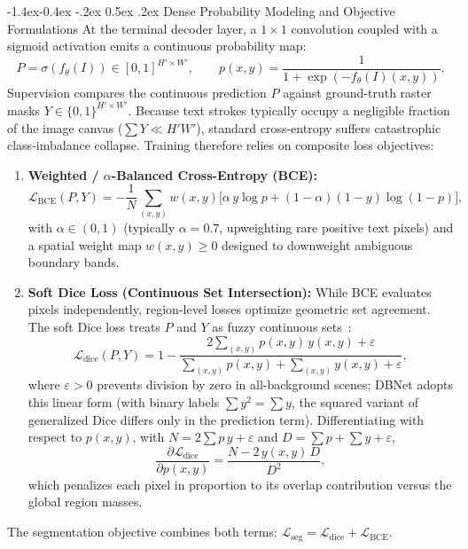 \documentclass[11pt,a4paper]{article}
\makeatletter
\renewcommand\subsection{\@startsection{subsection}{2}{\z@}%
                                     {-1.4ex\@plus -0.4ex \@minus -.2ex}%
                                     {0.5ex \@plus .2ex}%
                                     {\normalfont\normalsize\bfseries}}
\newcommand{\1}{\mathbf{1}}
\makeatother
\begin{document}
\subsection{Dense Probability Modeling and Objective Formulations}
At the terminal decoder layer, a $1{\times}1$ convolution coupled with a sigmoid activation emits a continuous probability map:
\begin{equation}
P = \sigma\!\left(f_\theta(I)\right) \in [0,1]^{H' \times W'}, \qquad p(x,y) = \frac{1}{1 + \exp\left(-f_\theta(I)(x,y)\right)}.
\label{eq:prob-map}
\end{equation}
Supervision compares the continuous prediction $P$ against ground-truth raster masks $Y \in \{0, 1\}^{H' \times W'}$. Because text strokes typically occupy a negligible fraction of the image canvas ($\sum Y \ll H'W'$), standard cross-entropy suffers catastrophic class-imbalance collapse. Training therefore relies on composite loss objectives:
\begin{enumerate}
    \item \textbf{Weighted / $\alpha$-Balanced Cross-Entropy (BCE):}
    \begin{equation}
    \mathcal{L}_{\mathrm{BCE}}(P, Y)
      = -\frac{1}{N} \sum_{(x,y)} w(x,y)
        \Big[ \alpha\, y \log p + (1-\alpha)(1-y)\log(1-p) \Big],
    \label{eq:bce}
    \end{equation}
    with $\alpha \in (0,1)$ (typically $\alpha = 0.7$, upweighting rare positive text pixels) and a spatial weight map $w(x,y) \ge 0$ designed to downweight ambiguous boundary bands.
    \item \textbf{Soft Dice Loss (Continuous Set Intersection):} While BCE evaluates pixels independently, region-level losses optimize geometric set agreement. The soft Dice loss treats $P$ and $Y$ as fuzzy continuous sets~\cite{dice}:
    \begin{equation}
    \mathcal{L}_{\mathrm{dice}}(P, Y)
      = 1 - \frac{2 \sum_{(x,y)} p(x,y)\, y(x,y) + \varepsilon}{\sum_{(x,y)} p(x,y) + \sum_{(x,y)} y(x,y) + \varepsilon},
    \label{eq:dice}
    \end{equation}
    where $\varepsilon > 0$ prevents division by zero in all-background scenes; DBNet adopts this linear form (with binary labels $\sum y^2 = \sum y$, the squared variant of generalized Dice differs only in the prediction term). Differentiating with respect to $p(x,y)$, with $N = 2\sum p\,y + \varepsilon$ and $D = \sum p + \sum y + \varepsilon$,
    \begin{equation}
    \frac{\partial \mathcal{L}_{\mathrm{dice}}}{\partial p(x,y)}
      = \frac{N - 2\, y(x,y)\, D}{D^{2}},
    \label{eq:dice-grad}
    \end{equation}
    which penalizes each pixel in proportion to its overlap contribution versus the global region masses.
\end{enumerate}
The segmentation objective combines both terms: $\mathcal{L}_{\mathrm{seg}} = \mathcal{L}_{\mathrm{dice}} + \mathcal{L}_{\mathrm{BCE}}$.
\end{document}
